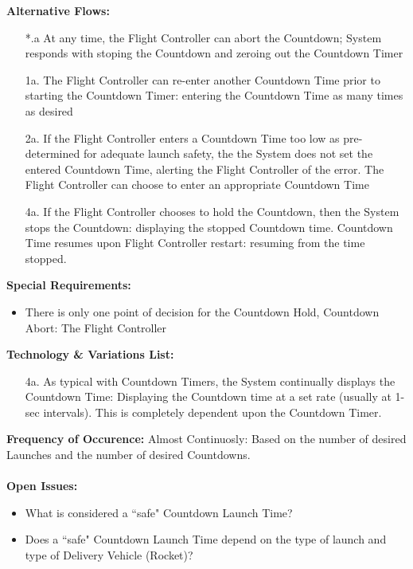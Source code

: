 \documentclass[letterpaper]{article}
\begin{document}
\textbf{Alternative Flows:}
\begin{itemize}
\item[*.a]At any time, the Flight Controller can abort the Countdown;
System responds with stoping the Countdown and zeroing out the
Countdown Timer
\item[1a.]The Flight Controller can re-enter another Countdown Time
prior to starting the Countdown Timer:  entering the Countdown Time
as many times as desired
\item[2a.]If the Flight Controller enters a Countdown Time too low as
pre-determined for adequate launch safety, the the System does not
set the entered Countdown Time, alerting the Flight Controller of the
error.  The Flight Controller can choose to enter an appropriate
Countdown Time
\item[4a.]If the Flight Controller chooses to hold the Countdown, then
the System stops the Countdown: displaying the stopped Countdown time.
Countdown Time resumes upon Flight Controller restart:  resuming from
the time stopped.
\end{itemize}
\textbf{Special Requirements:}
\begin{itemize}
\item  There is only one point of decision for the Countdown Hold,
Countdown Abort:  The Flight Controller
\end{itemize}
\textbf{Technology \& Variations List:}
\begin{itemize}
\item[4a.] As typical with Countdown Timers, the System continually
displays the Countdown Time:  Displaying the Countdown time at a set
rate (usually at 1-sec intervals).  This is completely dependent upon
the Countdown Timer.
\end{itemize}
\textbf{Frequency of Occurence:  }Almost Continuosly:  Based on the
number of desired Launches and the number of desired Countdowns.\\\\
\textbf{Open Issues:}
\begin{itemize}
\item What is considered a ``safe" Countdown Launch Time?
\item Does a ``safe" Countdown Launch Time depend on the type of
launch and type of Delivery Vehicle (Rocket)?
\end{itemize}
\end{document}
